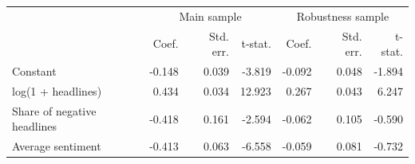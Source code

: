 \begin{tabular}{lrrrrrr}
\toprule
 & \multicolumn{3}{c}{Main sample} & \multicolumn{3}{c}{Robustness sample} \\
 & Coef. & Std. err. & t-stat. & Coef. & Std. err. & t-stat. \\
\midrule
Constant & -0.148 & 0.039 & -3.819 & -0.092 & 0.048 & -1.894 \\
log(1 + headlines) & 0.434 & 0.034 & 12.923 & 0.267 & 0.043 & 6.247 \\
Share of negative headlines & -0.418 & 0.161 & -2.594 & -0.062 & 0.105 & -0.590 \\
Average sentiment & -0.413 & 0.063 & -6.558 & -0.059 & 0.081 & -0.732 \\
\bottomrule
\end{tabular}
